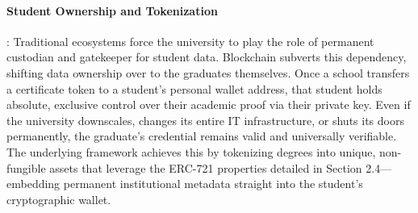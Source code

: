 \paragraph{Student Ownership and Tokenization}: Traditional ecosystems force the university to play the role of permanent custodian and gatekeeper for student data. Blockchain subverts this dependency, shifting data ownership over to the graduates themselves\cite{blockchainineducation}. Once a school transfers a certificate token to a student's personal wallet address, that student holds absolute, exclusive control over their academic proof via their private key\cite{blockchainineducationv2}. Even if the university downscales, changes its entire IT infrastructure, or shuts its doors permanently, the graduate's credential remains valid and universally verifiable\cite{blockchainineducation}. The underlying framework achieves this by tokenizing degrees into unique, non-fungible assets that leverage the ERC-721 properties detailed in Section 2.4—embedding permanent institutional metadata straight into the student's cryptographic wallet.


